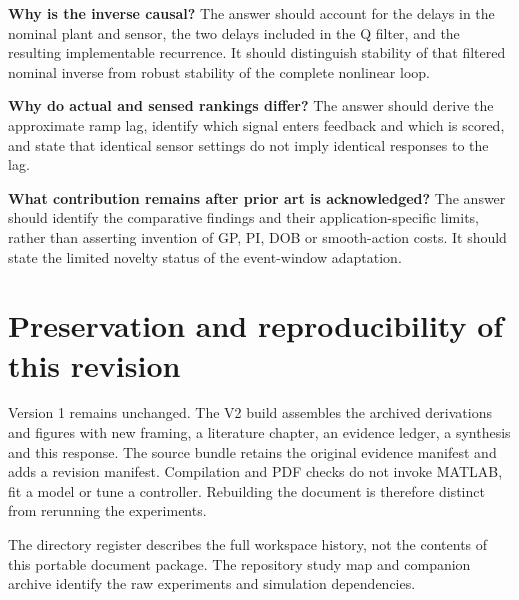 \textbf{Why is the inverse causal?} The answer should account for the delays in the nominal plant and sensor, the two delays included in the Q filter, and the resulting implementable recurrence. It should distinguish stability of that filtered nominal inverse from robust stability of the complete nonlinear loop.

\textbf{Why do actual and sensed rankings differ?} The answer should derive the approximate ramp lag, identify which signal enters feedback and which is scored, and state that identical sensor settings do not imply identical responses to the lag.

\textbf{What contribution remains after prior art is acknowledged?} The answer should identify the comparative findings and their application-specific limits, rather than asserting invention of GP, PI, DOB or smooth-action costs. It should state the limited novelty status of the event-window adaptation.

\section{Preservation and reproducibility of this revision}
Version 1 remains unchanged. The V2 build assembles the archived derivations and figures with new framing, a literature chapter, an evidence ledger, a synthesis and this response. The source bundle retains the original evidence manifest and adds a revision manifest. Compilation and PDF checks do not invoke MATLAB, fit a model or tune a controller. Rebuilding the document is therefore distinct from rerunning the experiments.

The directory register describes the full workspace history, not the contents of this portable document package. The repository study map and companion archive identify the raw experiments and simulation dependencies.
